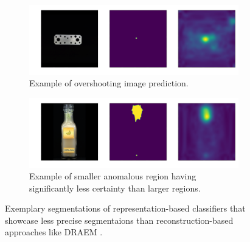 \begin{figure}[H]
    \captionsetup[subfigure]{justification=centering}
    \centering
    \begin{subfigure}[b]{0.45\textwidth}
        \centering
        \includegraphics[width=\textwidth]{figures/overshootexamples/flat_connector_test_logical_anomalies_004.png}
        \caption{Example of overshooting image prediction.}

    \end{subfigure}
    \begin{subfigure}[b]{0.45\textwidth}
        \centering
        \includegraphics[width=\textwidth]{figures/overshootexamples/juice_bottle_test_structural_anomalies_019.png}
        \caption{Example of smaller anomalous region having significantly less certainty than larger regions.}

    \end{subfigure}
    
    \caption{Exemplary segmentations of representation-based classifiers that showcase less precise segmentaions than reconstruction-based approaches like DRAEM \cite{Zavrtanik_2021DRAEM}.}
    \label{fig:overshoot}
\end{figure}